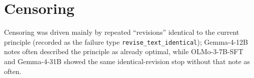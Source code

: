 \section{Censoring}\label{app:censoring}

Censoring was driven mainly by repeated ``revisions'' identical to the current principle (recorded as the failure type \texttt{revise\_text\_identical}); Gemma-4-12B notes often described the principle as already optimal, while OLMo-3-7B-SFT and Gemma-4-31B showed the same identical-revision stop without that note as often.
